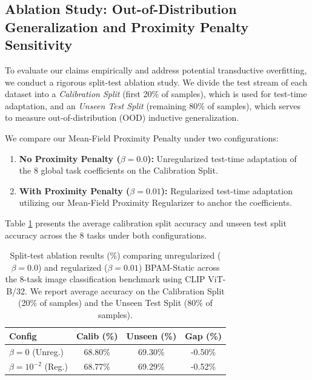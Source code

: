 \subsection{Ablation Study: Out-of-Distribution Generalization and Proximity Penalty Sensitivity}
To evaluate our claims empirically and address potential transductive overfitting, we conduct a rigorous split-test ablation study. We divide the test stream of each dataset into a {\it Calibration Split} (first 20\% of samples), which is used for test-time adaptation, and an {\it Unseen Test Split} (remaining 80\% of samples), which serves to measure out-of-distribution (OOD) inductive generalization.

We compare our Mean-Field Proximity Penalty under two configurations:
\begin{enumerate}
    \item {\bf No Proximity Penalty ($\beta = 0.0$):} Unregularized test-time adaptation of the 8 global task coefficients on the Calibration Split.
    \item {\bf With Proximity Penalty ($\beta = 0.01$):} Regularized test-time adaptation utilizing our Mean-Field Proximity Regularizer to anchor the coefficients.
\end{enumerate}

Table \ref{tab:ablation_results} presents the average calibration split accuracy and unseen test split accuracy across the 8 tasks under both configurations.

\begin{table}[h]
\caption{Split-test ablation results (\%) comparing unregularized ($\beta = 0.0$) and regularized ($\beta = 0.01$) BPAM-Static across the 8-task image classification benchmark using CLIP ViT-B/32. We report average accuracy on the Calibration Split (20\% of samples) and the Unseen Test Split (80\% of samples).}
\label{tab:ablation_results}
\vskip 0.15in
\begin{center}
\begin{small}
\begin{sc}
\setlength{\tabcolsep}{3pt}
\begin{tabular}{lccc}
\toprule
Config & Calib (\%) & Unseen (\%) & Gap (\%) \\
\midrule
$\beta = 0$ (Unreg.) & 68.80\% & 69.30\% & -0.50\% \\
$\beta = 10^{-2}$ (Reg.) & 68.77\% & 69.29\% & -0.52\% \\
\bottomrule
\end{tabular}
\end{sc}
\end{small}
\end{center}
\vskip -0.1in
\end{table}

